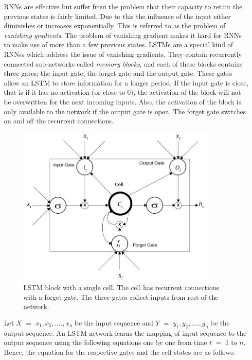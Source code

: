 \glspl{RNN} are effective but suffer from the problem that their capacity to retain the previous states is fairly limited. Due to this the influence of the input either diminishes or increases exponentially. This is referred to as the problem of \textit{vanishing gradients}\cite{hochreiter2001gradient}. The problem of vanishing gradient makes it hard for \glspl{RNN} to make use of more than a few previous states. \glspl{LSTM} are a special kind of \glspl{RNN}s which address the issue of vanishing gradients. They contain recurrently connected sub-networks called \textit{memory blocks}, and each of these blocks contains three gates; the input gate, the forget gate and the output gate. These gates allow an \gls{LSTM} to store information for a longer period. If the input gate is close, that is if it has no activation (or close to 0), the activation of the block will not be overwritten for the next incoming inputs. Also, the activation of the block is only available to the network if the output gate is open. The forget gate switches on and off the recurrent connections.

\begin{figure}[!htbp]
    \centering
    \includegraphics[width=10cm]{pics/lstm.jpg}
    \captionsetup{justification=centering,margin=2cm}
    \caption{\gls{LSTM} block with a single cell. The cell has recurrent connections with a forget gate. The three gates collect inputs from rest of the network. }
    \label{fig:LSTM_BLOCK}
\end{figure}


Let $X$ $=$ ${x_{1}, x_{2},....,x_{n}}$ be the input sequence and $Y$ $=$ ${y_{1}, y_{2},....,y_{n}}$ be the output sequence. An \gls{LSTM} network learns the mapping of input sequence to the output sequence using the following equations one by one from time $t$ $=$ 1 to $n$. Hence, the equation for the respective gates and the cell states are as follows:

